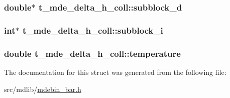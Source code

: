\hypertarget{structt__mde__delta__h__coll_ab26722c52478297b8ac8396d714b239c}{
\subsubsection[{subblock\-\_\-d}]{\setlength{\rightskip}{0pt plus 5cm}double$\ast$ {\bf t\-\_\-mde\-\_\-delta\-\_\-h\-\_\-coll\-::subblock\-\_\-d}}}\label{structt__mde__delta__h__coll_ab26722c52478297b8ac8396d714b239c}
\hypertarget{structt__mde__delta__h__coll_abdd1f208cbb796f7e34e0a806f1c9942}{
\subsubsection[{subblock\-\_\-i}]{\setlength{\rightskip}{0pt plus 5cm}int$\ast$ {\bf t\-\_\-mde\-\_\-delta\-\_\-h\-\_\-coll\-::subblock\-\_\-i}}}\label{structt__mde__delta__h__coll_abdd1f208cbb796f7e34e0a806f1c9942}
\hypertarget{structt__mde__delta__h__coll_a668a4aaeea23b0bbbdd0d327a266839a}{
\subsubsection[{temperature}]{\setlength{\rightskip}{0pt plus 5cm}double {\bf t\-\_\-mde\-\_\-delta\-\_\-h\-\_\-coll\-::temperature}}}\label{structt__mde__delta__h__coll_a668a4aaeea23b0bbbdd0d327a266839a}


\-The documentation for this struct was generated from the following file\-:\begin{DoxyCompactItemize}
\item 
src/mdlib/\hyperlink{mdebin__bar_8h}{mdebin\-\_\-bar.\-h}\end{DoxyCompactItemize}
